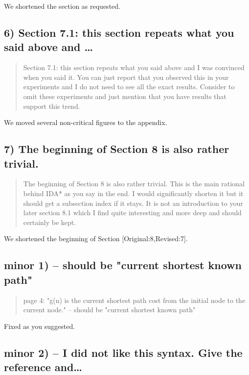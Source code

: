 \documentclass{article}
\begin{document}
We shortened the section as requested.

\subsection{6) Section 7.1: this section repeats what you said above and \ldots{}}
\label{sec:orgheadline7}

\begin{quote}
Section 7.1: this section repeats what you said above and I was
convinced when you said it. You can just report that you observed this
in your experiments and I do not need to see all the exact results.
Consider to omit these experiments and just mention that you have
results that support this trend.
\end{quote}

We moved several non-critical figures to the appendix.

\subsection{7) The beginning of Section 8 is also rather trivial.}
\label{sec:orgheadline8}

\begin{quote}
The beginning of Section 8 is also rather trivial. This is the main
rational behind IDA* as you say in the end. I would significantly
shorten it but it should get a subsection index if it stays. It is not
an introduction to your later section 8.1 which I find quite
interesting and more deep and should certainly be kept.
\end{quote}

We shortened the beginning of Section [Original:8,Revised:7].

\subsection{minor 1) -- should be "current shortest known path"}
\label{sec:orgheadline9}

\begin{quote}
page 4: "g(n) is the current shortest path cost from the initial node
to the current node." -- should be "current shortest known path"
\end{quote}

Fixed as you suggested.

\subsection{minor 2) -- I did not like this syntax. Give the reference and\ldots{}}
\label{sec:orgheadline10}
\end{document}
